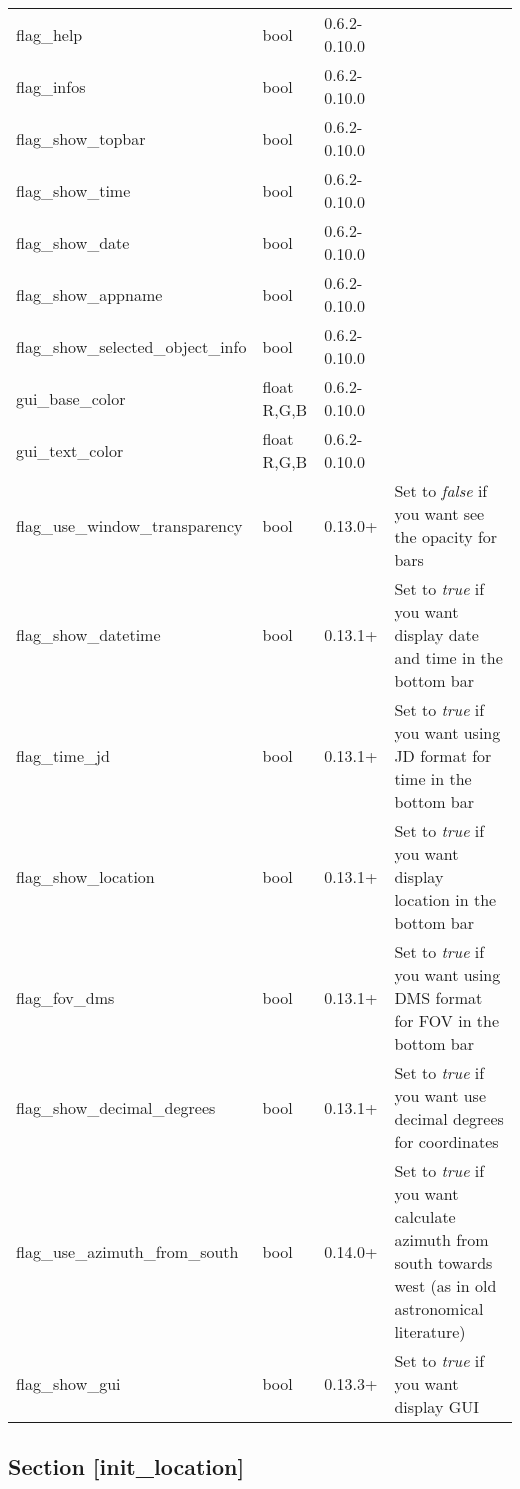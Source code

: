 \begin{longtable}[c]{@{}llll@{}}
flag\_help & bool & 0.6.2-0.10.0 &\tabularnewline
flag\_infos & bool & 0.6.2-0.10.0 &\tabularnewline
flag\_show\_topbar & bool & 0.6.2-0.10.0 &\tabularnewline
flag\_show\_time & bool & 0.6.2-0.10.0 &\tabularnewline
flag\_show\_date & bool & 0.6.2-0.10.0 &\tabularnewline
flag\_show\_appname & bool & 0.6.2-0.10.0 &\tabularnewline
flag\_show\_selected\_object\_info & bool & 0.6.2-0.10.0
&\tabularnewline
gui\_base\_color & float R,G,B & 0.6.2-0.10.0 &\tabularnewline
gui\_text\_color & float R,G,B & 0.6.2-0.10.0 &\tabularnewline
flag\_use\_window\_transparency & bool & 0.13.0+ & Set to \emph{false}
if you want see the opacity for bars\tabularnewline
flag\_show\_datetime & bool & 0.13.1+ & Set to \emph{true} if you want
display date and time in the bottom bar\tabularnewline
flag\_time\_jd & bool & 0.13.1+ & Set to \emph{true} if you want using
JD format for time in the bottom bar\tabularnewline
flag\_show\_location & bool & 0.13.1+ & Set to \emph{true} if you want
display location in the bottom bar\tabularnewline
flag\_fov\_dms & bool & 0.13.1+ & Set to \emph{true} if you want using
DMS format for FOV in the bottom bar\tabularnewline
flag\_show\_decimal\_degrees & bool & 0.13.1+ & Set to \emph{true} if
you want use decimal degrees for coordinates\tabularnewline
flag\_use\_azimuth\_from\_south & bool & 0.14.0+ & Set to \emph{true} if
you want calculate azimuth from south towards west (as in old
astronomical literature)\tabularnewline
flag\_show\_gui & bool & 0.13.3+ & Set to \emph{true} if you want
display GUI\tabularnewline
\bottomrule
\end{longtable}

\subsection{Section
{[}init\_location{]}}\label{section-initux5flocation}

